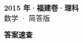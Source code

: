 \documentclass[zihao=-4, a4paper]{ctexart}
\begin{document}
\begin{center}
  {\Large\bfseries 2015 年·福建卷·理科}\\[4pt]
  {\large 数学 · 简答版}
\end{center}
\medskip
{}

\clearpage
{}
\begin{center}{\Large\bfseries 答案速查}\end{center}
\medskip

\end{document}
